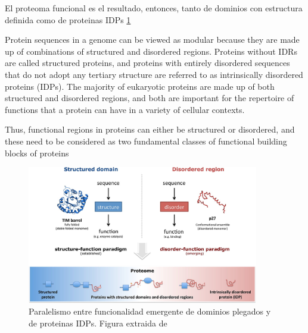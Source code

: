 



El proteoma funcional es el resultado, entonces, tanto de dominios con estructura definida como de proteinas IDPs \ref{stuctured-idp-functions}

Protein sequences in a genome can be viewed as modular because they are made up of combinations of structured and disordered regions.
Proteins without IDRs are called structured proteins, and proteins with entirely disordered sequences that do not adopt any tertiary
structure are referred to as intrinsically disordered proteins (IDPs). 
The majority of eukaryotic proteins are made up of both structured and disordered regions, and both are important for the
repertoire of functions that a protein can have in a variety of cellular contexts.

Thus, functional regions in proteins can
either be structured or disordered, and these need to be
considered as two fundamental classes of functional building
blocks of proteins


\begin{figure}[h!,centered]
\centering
\includegraphics[width=0.9\textwidth]{img/structure-idp-function.jpeg} 
\caption{Paralelismo entre funcionalidad emergente de dominios plegados y de proteinas IDPs. Figura extraida de \cite{van2014classification}}
\label{stuctured-idp-functions}
\end{figure}



